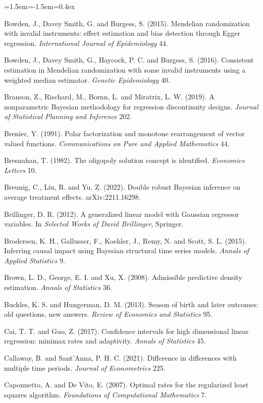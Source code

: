 \begin{list}{}{\leftmargin=1.5em\itemindent=-1.5em\itemsep=0.4ex}
\item Bowden, J., Davey Smith, G. and Burgess, S. (2015). Mendelian randomization with invalid instruments: effect estimation and bias detection through Egger regression. \emph{International Journal of Epidemiology} 44.
\item Bowden, J., Davey Smith, G., Haycock, P. C. and Burgess, S. (2016). Consistent estimation in Mendelian randomization with some invalid instruments using a weighted median estimator. \emph{Genetic Epidemiology} 40.
\item Branson, Z., Rischard, M., Bornn, L. and Miratrix, L. W. (2019). A nonparametric Bayesian methodology for regression discontinuity designs. \emph{Journal of Statistical Planning and Inference} 202.
\item Brenier, Y. (1991). Polar factorization and monotone rearrangement of vector valued functions. \emph{Communications on Pure and Applied Mathematics} 44.
\item Bresnahan, T. (1982). The oligopoly solution concept is identified. \emph{Economics Letters} 10.
\item Breunig, C., Liu, R. and Yu, Z. (2022). Double robust Bayesian inference on average treatment effects. arXiv:2211.16298.
\item Brillinger, D. R. (2012). A generalized linear model with Gaussian regressor variables. In \emph{Selected Works of David Brillinger}, Springer.
\item Brodersen, K. H., Gallusser, F., Koehler, J., Remy, N. and Scott, S. L. (2015). Inferring causal impact using Bayesian structural time series models. \emph{Annals of Applied Statistics} 9.
\item Brown, L. D., George, E. I. and Xu, X. (2008). Admissible predictive density estimation. \emph{Annals of Statistics} 36.
\item Buckles, K. S. and Hungerman, D. M. (2013). Season of birth and later outcomes: old questions, new answers. \emph{Review of Economics and Statistics} 95.
\item Cai, T. T. and Guo, Z. (2017). Confidence intervals for high dimensional linear regression: minimax rates and adaptivity. \emph{Annals of Statistics} 45.
\item Callaway, B. and Sant'Anna, P. H. C. (2021). Difference in differences with multiple time periods. \emph{Journal of Econometrics} 225.
\item Caponnetto, A. and De Vito, E. (2007). Optimal rates for the regularized least squares algorithm. \emph{Foundations of Computational Mathematics} 7.

\end{list}
